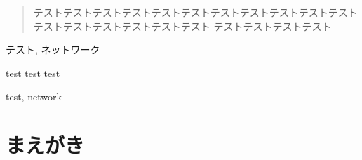 \documentclass{ieicej}
\begin{document}
\begin{abstract}
テストテストテストテストテストテストテストテストテストテストテスト
テストテストテストテストテストテスト
テストテストテストテスト
\end{abstract}
\begin{keyword}
テスト, ネットワーク
\end{keyword}
\begin{eabstract}
test test test
\end{eabstract}
\begin{ekeyword}
test, network
\end{ekeyword}
\maketitle

\section{まえがき}


\ack %

%
%
\begin{thebibliography}{99}%
\bibitem{}
\end{thebibliography}

\appendix
\section{}

\begin{biography}
\profile{}{}{}
\end{biography}
\end{document}
